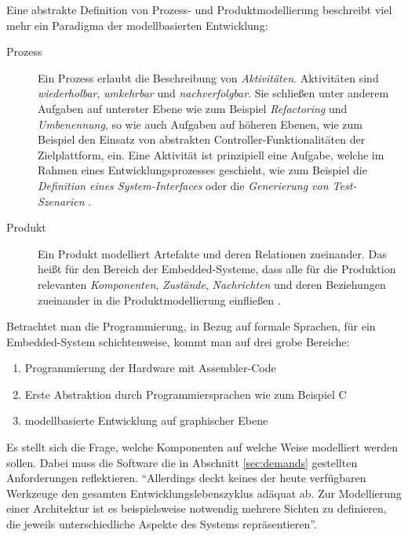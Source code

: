     Eine abstrakte Definition von Prozess- und Produktmodellierung beschreibt viel mehr ein Paradigma der
    modellbasierten Entwicklung:
    \begin{description}
        \item[Prozess] Ein Prozess erlaubt die Beschreibung von \textit{Aktivitäten}. Aktivitäten sind
        \textit{wiederholbar}, \textit{umkehrbar} und \textit{nachverfolgbar}. Sie schließen unter anderem Aufgaben
        auf unterster Ebene wie zum Beispiel \textit{Refactoring} und \textit{Umbenennung}, so wie auch Aufgaben auf höheren
        Ebenen, wie zum Beispiel den Einsatz von abstrakten Controller-Funktionalitäten der Zielplattform, ein.
        Eine Aktivität ist prinzipiell eine Aufgabe, welche im Rahmen eines Entwicklungsprozesses geschieht, wie zum Beispiel
        die \textit{Definition eines System-Interfaces} oder die \textit{Generierung von Test-Szenarien}
        \citep[vgl.~Kap.~1~und~2]{Schaetz2002}.
        \item[Produkt] Ein Produkt modelliert Artefakte und deren Relationen zueinander. Das heißt für den Bereich der
        Embedded\hyp{}Systeme, dass alle für die Produktion relevanten \textit{Komponenten}, \textit{Zustände},
        \textit{Nachrichten} und deren Beziehungen zueinander in die Produktmodellierung einfließen
        \citep[vgl.~Kap.~1~und~2]{Schaetz2002}.
    \end{description}

    Betrachtet man die Programmierung, in Bezug auf formale Sprachen, für ein Embedded-System schichtenweise, kommt man
    auf drei grobe Bereiche:
    \begin{enumerate}
        \item Programmierung der Hardware mit Assembler-Code
        \item Erste Abstraktion durch Programmiersprachen wie zum Beispiel C
        \item modellbasierte Entwicklung auf graphischer Ebene
    \end{enumerate}

    Es stellt sich die Frage, welche Komponenten auf welche Weise modelliert werden sollen. Dabei muss die Software die
    in Abschnitt \ref{sec:demands} gestellten Anforderungen reflektieren.
    ``Allerdings deckt keines der heute verfügbaren Werkzeuge den gesamten Entwicklungslebenszyklus adäquat ab. Zur
    Modellierung einer Architektur ist es beispielsweise notwendig mehrere Sichten zu definieren, die jeweils
    unterschiedliche Aspekte des Systems repräsentieren''\citep[]{Trapp11}.

